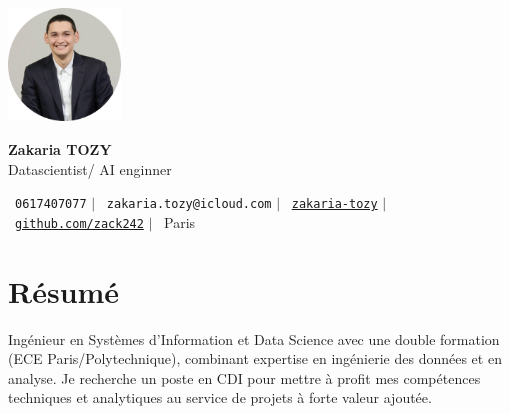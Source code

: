 \documentclass[11pt,a4paper]{article}
\begin{document}
\begin{flushleft}
  \begin{minipage}[c]{0.2\textwidth}
    \includegraphics[width=3cm]{images/profilpicture.png}
  \end{minipage}%
  \begin{minipage}[c]{0.8\textwidth}
    \hspace{10pt}
    {\huge \textbf{Zakaria TOZY}} \\ \vspace{10pt}
    \hspace{9pt}
    {\normalsize Datascientist/ AI enginner} \vspace{2pt}
  \end{minipage}
\end{flushleft}

\vspace{-5pt}

\begin{center}
    \small \faPhone\ \texttt{0617407077} \hspace{1pt} $|$
    \hspace{1pt} \faEnvelope\ \texttt{zakaria.tozy@icloud.com} \hspace{1pt} $|$
    \hspace{1pt} \faLinkedin\ \href{https://linkedin.com/in/zakaria-tozy}{\texttt{zakaria-tozy}} \hspace{1pt} $|$
    \hspace{1pt} \faGithub\ \href{https://github.com/zack242}{\texttt{github.com/zack242}} \hspace{1pt} $|$
    \hspace{1pt} \faMapMarker\ Paris
\end{center}

\vspace{10pt}
\section{Résumé}
Ingénieur en Systèmes d'Information et Data Science avec une double formation (ECE Paris/Polytechnique), combinant expertise en ingénierie des données et en analyse. Je recherche un poste en CDI pour mettre à profit mes compétences techniques et analytiques au service de projets à forte valeur ajoutée.
\end{document}
